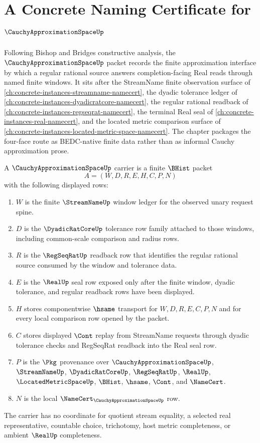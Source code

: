 \chapter{A Concrete Naming Certificate for $\CauchyApproximationSpaceUp$}
\label{ch:concrete-instances-cauchy-approximation-space-namecert}

Following Bishop and Bridges constructive analysis, the $\CauchyApproximationSpaceUp$ packet records the finite approximation interface by which a regular rational source answers completion-facing Real reads through named finite windows. It sits after the StreamName finite observation surface of \autoref{ch:concrete-instances-streamname-namecert}, the dyadic tolerance ledger of \autoref{ch:concrete-instances-dyadicratcore-namecert}, the regular rational readback of \autoref{ch:concrete-instances-regseqrat-namecert}, the terminal Real seal of \autoref{ch:concrete-instances-real-namecert}, and the located metric comparison surface of \autoref{ch:concrete-instances-located-metric-space-namecert}. The chapter packages the four-face route as BEDC-native finite data rather than as informal Cauchy approximation prose.

\begin{definition}
\label{def:cauchy-approximation-space-carrier}
A $\CauchyApproximationSpaceUp$ carrier is a finite $\BHist$ packet
$$
A=(W,D,R,E,H,C,P,N)
$$
with the following displayed rows:
\begin{enumerate}
\item $W$ is the finite $\StreamNameUp$ window ledger for the observed unary request spine.
\item $D$ is the $\DyadicRatCoreUp$ tolerance row family attached to those windows, including common-scale comparison and radius rows.
\item $R$ is the $\RegSeqRatUp$ readback row that identifies the regular rational source consumed by the window and tolerance data.
\item $E$ is the $\RealUp$ seal row exposed only after the finite window, dyadic tolerance, and regular readback rows have been displayed.
\item $H$ stores componentwise $\hsame$ transport for $W,D,R,E,C,P,N$ and for every local comparison row opened by the packet.
\item $C$ stores displayed $\Cont$ replay from StreamName requests through dyadic tolerance checks and RegSeqRat readback into the Real seal row.
\item $P$ is the $\Pkg$ provenance over $\CauchyApproximationSpaceUp$, $\StreamNameUp$, $\DyadicRatCoreUp$, $\RegSeqRatUp$, $\RealUp$, $\LocatedMetricSpaceUp$, $\BHist$, $\hsame$, $\Cont$, and $\NameCert$.
\item $N$ is the local $\NameCert_{\CauchyApproximationSpaceUp}$ row.
\end{enumerate}
The carrier has no coordinate for quotient stream equality, a selected real representative, countable choice, trichotomy, host metric completeness, or ambient $\RealUp$ completeness.
\end{definition}

